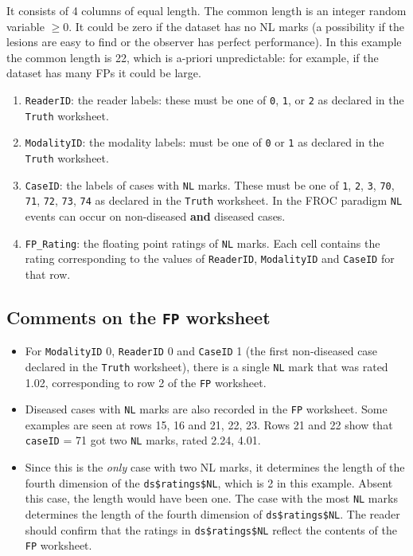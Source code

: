 \documentclass[
]{book}
\begin{document}
It consists of 4 columns of equal length. The common length is an integer random variable \(\ge 0\). It could be zero if the dataset has no NL marks (a possibility if the lesions are easy to find or the observer has perfect performance). In this example the common length is 22, which is a-priori unpredictable: for example, if the dataset has many FPs it could be large.

\begin{enumerate}
\def\labelenumi{\arabic{enumi}.}
\item
  \texttt{ReaderID}: the reader labels: these must be one of \texttt{0}, \texttt{1}, or \texttt{2} as declared in the \texttt{Truth} worksheet.
\item
  \texttt{ModalityID}: the modality labels: must be one of \texttt{0} or \texttt{1} as declared in the \texttt{Truth} worksheet.
\item
  \texttt{CaseID}: the labels of cases with \texttt{NL} marks. These must be one of \texttt{1}, \texttt{2}, \texttt{3}, \texttt{70}, \texttt{71}, \texttt{72}, \texttt{73}, \texttt{74} as declared in the \texttt{Truth} worksheet. In the FROC paradigm \texttt{NL} events can occur on non-diseased \textbf{and} diseased cases.
\item
  \texttt{FP\_Rating}: the floating point ratings of \texttt{NL} marks. Each cell contains the rating corresponding to the values of \texttt{ReaderID}, \texttt{ModalityID} and \texttt{CaseID} for that row.
\end{enumerate}

\hypertarget{quick-start-roc-fp-comments}{%
\subsection{\texorpdfstring{Comments on the \texttt{FP} worksheet}{Comments on the FP worksheet}}\label{quick-start-roc-fp-comments}}

\begin{itemize}
\item
  For \texttt{ModalityID} 0, \texttt{ReaderID} 0 and \texttt{CaseID} 1 (the first non-diseased case declared in the \texttt{Truth} worksheet), there is a single \texttt{NL} mark that was rated 1.02, corresponding to row 2 of the \texttt{FP} worksheet.
\item
  Diseased cases with \texttt{NL} marks are also recorded in the \texttt{FP} worksheet. Some examples are seen at rows 15, 16 and 21, 22, 23. Rows 21 and 22 show that \texttt{caseID} = 71 got two \texttt{NL} marks, rated 2.24, 4.01.
\item
  Since this is the \emph{only} case with two NL marks, it determines the length of the fourth dimension of the \texttt{ds\$ratings\$NL}, which is 2 in this example. Absent this case, the length would have been one. The case with the most \texttt{NL} marks determines the length of the fourth dimension of \texttt{ds\$ratings\$NL}. The reader should confirm that the ratings in \texttt{ds\$ratings\$NL} reflect the contents of the \texttt{FP} worksheet.
\end{itemize}
\end{document}
